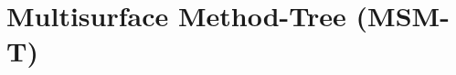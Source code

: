 \documentclass{beamer}
\begin{document}



\section{Multisurface Method-Tree (MSM-T)}
\end{document}
